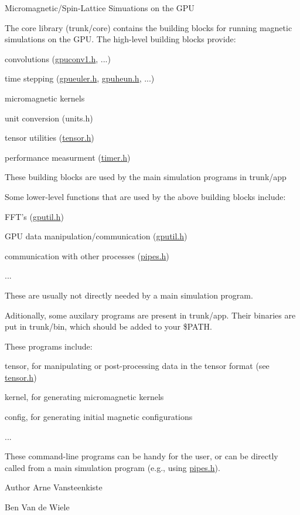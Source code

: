 Micromagnetic/Spin-\/Lattice Simuations on the GPU

The core library (trunk/core) contains the building blocks for running magnetic simulations on the GPU. The high-\/level building blocks provide:
\begin{DoxyItemize}
\item convolutions (\hyperlink{gpuconv1_8h}{gpuconv1.h}, ...)
\item time stepping (\hyperlink{structgpueuler_a498c5070bf962e7189b40e06fb7cab17}{gpueuler.h}, \hyperlink{structgpuheun_a46f8656e846de7e3db0842175856eb78}{gpuheun.h}, ...)
\item micromagnetic kernels
\item unit conversion (units.h)
\item tensor utilities (\hyperlink{tensor_8h}{tensor.h})
\item performance measurment (\hyperlink{timer_8h}{timer.h})
\end{DoxyItemize}

These building blocks are used by the main simulation programs in trunk/app

Some lower-\/level functions that are used by the above building blocks include:
\begin{DoxyItemize}
\item FFT's (\hyperlink{gputil_8h}{gputil.h})
\item GPU data manipulation/communication (\hyperlink{gputil_8h}{gputil.h})
\item communication with other processes (\hyperlink{pipes_8h}{pipes.h})
\item ...
\end{DoxyItemize}

These are usually not directly needed by a main simulation program.

Aditionally, some auxilary programs are present in trunk/app. Their binaries are put in trunk/bin, which should be added to your \$PATH.

These programs include:
\begin{DoxyItemize}
\item tensor, for manipulating or post-\/processing data in the tensor format (see \hyperlink{tensor_8h}{tensor.h})
\item kernel, for generating micromagnetic kernels
\item config, for generating initial magnetic configurations
\item ...
\end{DoxyItemize}

These command-\/line programs can be handy for the user, or can be directly called from a main simulation program (e.g., using \hyperlink{pipes_8h}{pipes.h}).

\begin{DoxyAuthor}{Author}
Arne Vansteenkiste 

Ben Van de Wiele 
\end{DoxyAuthor}
